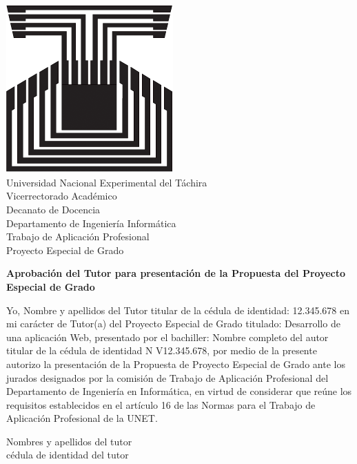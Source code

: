 \chapter*{}
\pagestyle{empty}
\thispagestyle{empty}


\begin{center}
\includegraphics[scale=0.2]{unet.jpg}\\

Universidad Nacional Experimental del T\'achira\\

Vicerrectorado Acad\'emico\\

Decanato de Docencia\\

Departamento de Ingenier\'ia Inform\'atica\\

Trabajo de Aplicaci\'on Profesional\\

Proyecto Especial de Grado\\

\end{center}

\begin{center}
\textbf{Aprobaci\'on del Tutor para presentaci\'on de la Propuesta del Proyecto Especial de Grado}
\end{center}

	Yo, Nombre y apellidos del Tutor titular de la c\'edula de identidad: 12.345.678 en mi car\'acter de Tutor(a) del Proyecto Especial de Grado titulado: Desarrollo de una aplicaci\'on Web, presentado por el bachiller: Nombre completo del autor titular de la c\'edula de identidad N V12.345.678, por medio de la presente autorizo la presentaci\'on de la Propuesta de Proyecto Especial de Grado ante los jurados designados por la comisi\'on de Trabajo de Aplicaci\'on Profesional del Departamento de Ingenier\'ia en Inform\'atica, en virtud de considerar que re\'une los requisitos establecidos en el art\'iculo 16 de las Normas para el Trabajo de Aplicaci\'on Profesional de la UNET.\\
	
	
	\begin{center}
	Nombres y apellidos del tutor\\
	
	c\'edula de identidad del tutor
	\end{center}